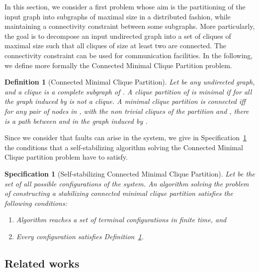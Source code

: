\documentclass[11pt,letterpaper,onecolumn]{article}
\newtheorem{definition}{Definition}
\newtheorem{spec}{Specification}
\begin{document}
In this section, we consider a first problem whose aim is the partitioning of the input graph into subgraphs of maximal size in a distributed fashion, while maintaining a connectivity constraint between some subgraphs. More particularly, the goal is to decompose an input undirected graph  into a set of cliques of maximal size such that all cliques of size at least two are connected. The connectivity constraint can be used for communication facilities. In the following, we define more formally the Connected Minimal Clique Partition problem.

\begin{definition}[Connected Minimal Clique Partition]
\label{def:cmcp}
Let  be any undirected graph, and a \emph{clique} is a complete subgraph of . A clique partition  of  is \emph{minimal} if for all  the graph induced by  is not a clique. A minimal clique partition  is \emph{connected} iff for any pair of nodes  in , with  the non trivial cliques of the partition and , there is a path between  and  in the graph induced by .
\end{definition}

Since we consider that faults can arise in the system, we give in Specification~\ref{spec:cmcp} the conditions that a self-stabilizing algorithm solving the Connected Minimal Clique partition problem have to satisfy.

\begin{spec}[Self-stabilizing Connected Minimal Clique Partition]
\label{spec:cmcp}
Let  be the set of all possible configurations of the system. An algorithm  solving the problem of constructing a stabilizing connected minimal clique partition satisfies the following conditions:
\begin{enumerate}
\item Algorithm  reaches a set of terminal configurations  in finite time, and
\item Every configuration  satisfies Definition~\ref{def:cmcp}.
\end{enumerate}
\end{spec}

\subsection{Related works}
\end{document}
